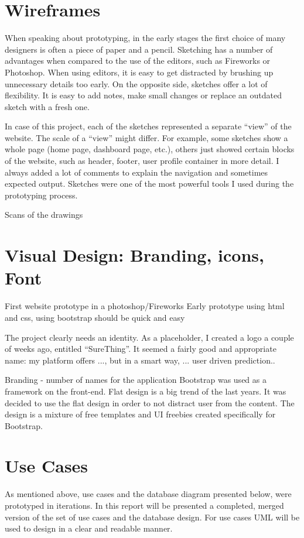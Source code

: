 \section{Wireframes}
\label{sec:wireframes_prototype}
When speaking about prototyping, in the early stages the first choice of many designers is often a piece of paper and a pencil. Sketching has a number of advantages when compared to the use of the editors, such as Fireworks or Photoshop. When using editors, it is easy to get distracted by brushing up unnecessary details too early. On the opposite side, sketches offer a lot of flexibility. It is easy to add notes, make small changes or replace an outdated sketch with a fresh one.

In case of this project, each of the sketches represented a separate “view” of the website. The scale of a “view” might differ. For example, some sketches show a whole page (home page, dashboard page, etc.), others just showed certain blocks of the website, such as header, footer, user profile container in more detail. I always added a lot of comments to explain the navigation and sometimes expected output. Sketches were one of the most powerful tools I used during the prototyping process. 


Scans of the drawings

\section{Visual Design: Branding, icons, Font}
\label{sec:visdesign_prototype}
First website prototype in a photoshop/Fireworks
Early prototype using html and css, using bootstrap should be quick and easy

The project clearly needs an identity. As a placeholder, I created a logo a couple of weeks ago, entitled “SureThing”. It seemed a fairly good and appropriate name: my platform offers ..., but in a smart way, ... user driven prediction..


Branding - number of names for the application
Bootstrap was used as a framework on the front-end.
Flat design is a big trend of the last years. It was decided to use the flat design in order to not distract user from the content.
The design is a mixture of free templates and UI freebies created specifically for Bootstrap.

\section{Use Cases}
\label{usecases_prototype}
As mentioned above, use cases and the database diagram presented below, were prototyped in iterations. In this report will be presented a completed, merged version of the set of use cases and the database design. For use cases UML will be used to design in a clear and readable manner.

